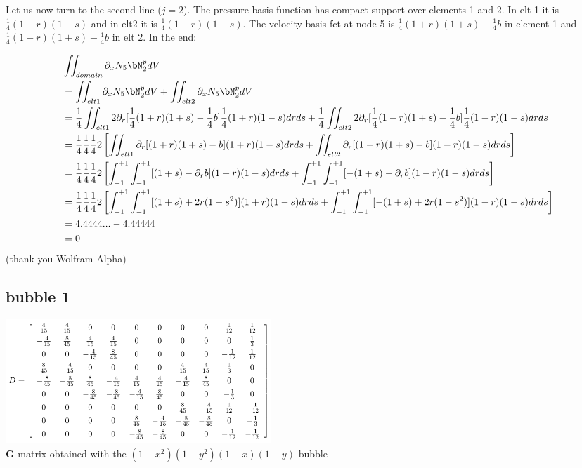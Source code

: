 Let us now turn to the second line ($j=2$). The pressure basis function has compact support
over elements 1 and 2. In elt 1 it is $\frac14(1+r)(1-s)$ and in elt2 it is $\frac14(1-r)(1-s)$.
The velocity basis fct at node 5 is $\frac14(1+r)(1+s)-\frac14 b$ in element 1 and 
$\frac14(1-r)(1+s) -\frac14 b$ in elt 2. In the end:

\begin{align}
&\iint_{domain} \partial_x N_5 \bN_2^p dV \nonumber\\
&= \iint_{elt1} \partial_x N_5 \bN_2^p dV + \iint_{elt2} \partial_x N_5 \bN_2^p dV \nonumber\\
&= 
\frac14 \iint_{elt1} 2\partial_r [\frac14(1+r)(1+s)-\frac14 b] \frac14(1+r)(1-s) drds +
\frac14 \iint_{elt2} 2\partial_r [\frac14(1-r)(1+s)-\frac14 b] \frac14(1-r)(1-s) drds \nonumber\\
&=
\frac14\frac14\frac14 2 
\left[ 
\iint_{elt1} \partial_r [(1+r)(1+s)-b] (1+r)(1-s) drds +
\iint_{elt2} \partial_r [(1-r)(1+s)-b] (1-r)(1-s) drds 
\right] \nonumber\\
&=
\frac14\frac14\frac14 2 
\left[ 
\int_{-1}^{+1} \int_{-1}^{+1}  [ (1+s)-\partial_r b] (1+r)(1-s) drds +
\int_{-1}^{+1} \int_{-1}^{+1}  [-(1+s)-\partial_r b] (1-r)(1-s) drds 
\right] \nonumber\\
&= 
\frac14\frac14\frac14 2 
\left[ 
\int_{-1}^{+1} \int_{-1}^{+1}  [ (1+s) +2r(1-s^2)] (1+r)(1-s) drds +
\int_{-1}^{+1} \int_{-1}^{+1}  [-(1+s) +2r(1-s^2)] (1-r)(1-s) drds
\right] \nonumber\\ 
&= 4.4444... -4.44444 \nonumber\\ 
&= 0
\end{align}
(thank you Wolfram Alpha)





\newpage
\subsection*{bubble 1}

\begin{center}
\includegraphics[width=10cm]{python_codes/fieldstone_72/images/mat2}\\
{\captionfont ${\bm G}$ matrix obtained with the $(1-x^2)(1-y^2)(1-x)(1-y)$ bubble}
\end{center}

